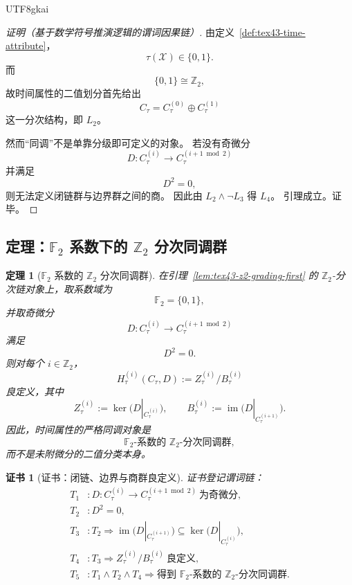 \documentclass[12pt]{article}
\newtheorem{theorem}{定理}[section]
\newtheorem{Certificate}{证书}[section]
\newcommand{\Ztwo}{\mathbb{Z}_2}
\newcommand{\Ftwo}{\mathbb{F}_2}
\newcommand{\Img}{\operatorname{im}}
\newcommand{\Ker}{\operatorname{ker}}
\begin{document}
\begin{CJK*}{UTF8}{gkai}
\begin{proof}[证明（基于数学符号推演逻辑的谓词因果链）]
由定义~\ref{def:tex43-time-attribute}，
\[
  \tau(\mathcal X)\in\{0,1\}.
\]
而
\[
  \{0,1\}\cong \Ztwo,
\]
故时间属性的二值划分首先给出
\[
  C_{\tau}=C_{\tau}^{(0)}\oplus C_{\tau}^{(1)}
\]
这一分次结构，即 $L_2$。

然而“同调”不是单靠分级即可定义的对象。
若没有奇微分
\[
  D:C_{\tau}^{(i)}\to C_{\tau}^{(i+1\bmod 2)}
\]
并满足
\[
  D^2=0,
\]
则无法定义闭链群与边界群之间的商。
因此由 $L_2\wedge \neg L_3$ 得 $L_4$。
引理成立。证毕。
\end{proof}

\subsection{定理：\texorpdfstring{$\Ftwo$}{F2} 系数下的 \texorpdfstring{$\Ztwo$}{Z2} 分次同调群}
\label{subsec:tex43-ch2-theorem-homology}

\begin{theorem}[\texorpdfstring{$\Ftwo$}{F2} 系数的 \texorpdfstring{$\Ztwo$}{Z2} 分次同调群]
\label{thm:tex43-f2-z2-homology}
在引理~\ref{lem:tex43-z2-grading-first} 的 \(\Ztwo\)-分次链对象上，取系数域为
\[
  \Ftwo=\{0,1\},
\]
并取奇微分
\[
  D:C_{\tau}^{(i)}\to C_{\tau}^{(i+1\bmod 2)}
\]
满足
\[
  D^2=0.
\]
则对每个 $i\in\Ztwo$，
\[
  H_{\tau}^{(i)}(C_{\tau},D)
  :=
  Z_{\tau}^{(i)} / B_{\tau}^{(i)}
\]
良定义，其中
\[
  Z_{\tau}^{(i)}:=\Ker\!\bigl(D|_{C_{\tau}^{(i)}}\bigr),
  \qquad
  B_{\tau}^{(i)}:=\Img\!\bigl(D|_{C_{\tau}^{(i+1)}}\bigr).
\]
因此，时间属性的严格同调对象是
\[
  \Ftwo\text{-系数的 }\Ztwo\text{-分次同调群},
\]
而不是未附微分的二值分类本身。
\end{theorem}

\begin{Certificate}[证书：闭链、边界与商群良定义]
\label{cert:tex43-f2-z2-homology}
证书登记谓词链：
\[
\begin{aligned}
  T_1 &: D:C_{\tau}^{(i)}\to C_{\tau}^{(i+1\bmod 2)}\ \text{为奇微分},\\
  T_2 &: D^2=0,\\
  T_3 &: T_2\Rightarrow \Img\!\bigl(D|_{C_{\tau}^{(i+1)}}\bigr)\subseteq \Ker\!\bigl(D|_{C_{\tau}^{(i)}}\bigr),\\
  T_4 &: T_3\Rightarrow Z_{\tau}^{(i)} / B_{\tau}^{(i)}\ \text{良定义},\\
  T_5 &: T_1\wedge T_2\wedge T_4\Rightarrow \text{得到 }\Ftwo\text{-系数的 }\Ztwo\text{-分次同调群}.
\end{aligned}
\]
\end{Certificate}


\end{CJK*}
\end{document}
